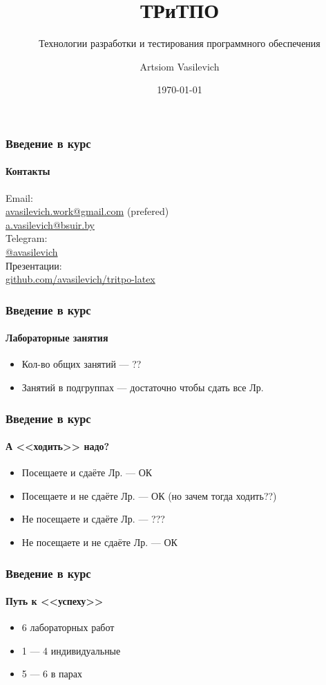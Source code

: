 \documentclass[aspectratio=169, 12pt]{beamer}
\title{ТРиТПО}
\subtitle{Технологии разработки и тестирования программного обеспечения}
\author{Artsiom Vasilevich}
\institute[BSUIR]{Belarusian State University of Informatics and Radioelectronics}
\date{\tiny \today}
\begin{document}
\frame{\titlepage}

\begin{frame}[t]
    \frametitle{Введение в курс}
    \framesubtitle{Контакты}
    Email: \\
    \hspace{0.5cm} \href{mailto:avasilevich.work@gmail.com}{avasilevich.work@gmail.com} (prefered) \\
    \hspace{0.5cm} \href{mailto:a.vasilevich@bsuir.by}{a.vasilevich@bsuir.by} \\
    \vspace{\baselineskip}
    Telegram: \\
    \hspace{0.5cm} \href{https://t.me/avasilevich}{@avasilevich} \\
    \vspace{\baselineskip}
    Презентации: \\
    \hspace{0.5cm} \href{https://github.com/avasilevich/tritpo-latex}{github.com/avasilevich/tritpo-latex} \\
\end{frame}

\begin{frame}
    \frametitle{Введение в курс}
    \framesubtitle{Лабораторные занятия}
    \begin{itemize}
        \item Кол-во общих занятий --- ??
        \item Занятий в подгруппах --- достаточно чтобы сдать все Лр.
    \end{itemize}
\end{frame}

\begin{frame}
    \frametitle{Введение в курс}
    \framesubtitle{А <<ходить>> надо?} \pause
    \begin{itemize}
        \item Посещаете и сдаёте Лр. --- ОК \pause
        \item Посещаете и не сдаёте Лр. --- ОК (но зачем тогда ходить??) \pause
        \item Не посещаете и сдаёте Лр. --- ??? \pause
        \item Не посещаете и не сдаёте Лр. --- ОК
    \end{itemize}
\end{frame}

\begin{frame}
    \frametitle{Введение в курс}
    \framesubtitle{Путь к <<успеху>>}
    \begin{itemize}
        \item 6 лабораторных работ
        \item 1 --- 4 индивидуальные
        \item 5 --- 6 в парах
    \end{itemize}
\end{frame}
\end{document}

